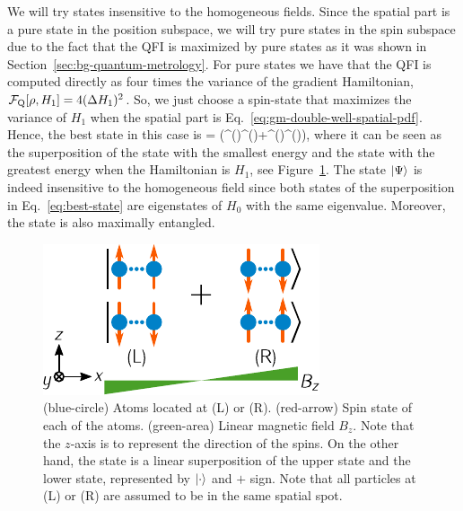 We will try states insensitive to the homogeneous fields.
Since the spatial part is a pure state in the position subspace, we will try pure states in the spin subspace due to the fact that the QFI is maximized by pure states as it was shown in Section~\ref{sec:bg-quantum-metrology}.
For pure states we have that the QFI is computed directly as four times the variance of the gradient Hamiltonian, $\mathcal{F}_{\textnormal{Q}}[{\textstyle \rho, H_1}]=4(\Delta H_1 )^2$.
So, we just choose a spin-state that maximizes the variance of $H_1$ when the spatial part is Eq.~\eqref{eq:gm-double-well-spatial-pdf}.
Hence, the best state in this case is
\be
  \ket{\Psi} = (^{()}^{()}+^{()}^{()}),
  \label{eq:best-state}
\ee
where it can be seen as the superposition of the state with the smallest energy and the state with the greatest energy when the Hamiltonian is $H_1$, see Figure~\ref{fig:gm-double-well}.
The state $\vert{\Psi}\rangle$ is indeed insensitive to the homogeneous field since both states of the superposition in Eq.~\eqref{eq:best-state} are eigenstates of $H_0$ with the same eigenvalue.
Moreover, the state is also maximally entangled.
\begin{figure}[htp]
  \begin{center}
    \includegraphics[scale=1.2]{img/GM_double_well.pdf}
    \caption[Best entangled state for the spatial two-ensembles]{
    (blue-circle) Atoms located at (L) or (R).
    (red-arrow) Spin state of each of the atoms.
    (green-area) Linear magnetic field $B_z$.
    Note that the $z$-axis is to represent the direction of the spins.
    On the other hand, the state is a linear superposition of the upper state and the lower state, represented by $\vert{\cdot}\rangle$ and $+$ sign.
    Note that all particles at (L) or (R) are assumed to be in the same spatial spot.}
    \label{fig:gm-double-well}
  \end{center}
\end{figure}

